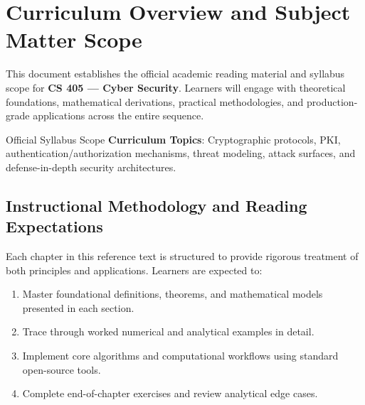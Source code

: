 \section{Curriculum Overview and Subject Matter Scope}

This document establishes the official academic reading material and syllabus scope for \textbf{CS 405 --- Cyber Security}. Learners will engage with theoretical foundations, mathematical derivations, practical methodologies, and production-grade applications across the entire sequence.

\begin{InsightBox}{Official Syllabus Scope}
  \textbf{Curriculum Topics}: Cryptographic protocols, PKI, authentication/authorization mechanisms, threat modeling, attack surfaces, and defense-in-depth security architectures.
\end{InsightBox}

\subsection{Instructional Methodology and Reading Expectations}

Each chapter in this reference text is structured to provide rigorous treatment of both principles and applications. Learners are expected to:
\begin{enumerate}
  \item Master foundational definitions, theorems, and mathematical models presented in each section.
  \item Trace through worked numerical and analytical examples in detail.
  \item Implement core algorithms and computational workflows using standard open-source tools.
  \item Complete end-of-chapter exercises and review analytical edge cases.
\end{enumerate}

